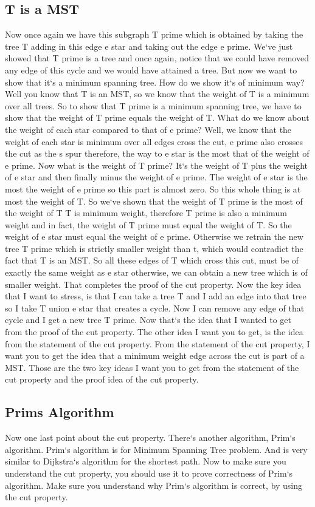 \subsection{T is a MST}
Now once again we have this subgraph T prime which is obtained by taking the tree T adding in this edge e star and taking out the edge e prime.
We`ve just showed that T prime is a tree and once again, notice that we could have removed any edge of this cycle and we would have attained a tree.
But now we want to show that it`s a minimum spanning tree.
How do we show it`s of minimum way? Well you know that T is an MST, so we know that the weight of T is a minimum over all trees.
So to show that T prime is a minimum spanning tree, we have to show that the weight of T prime equals the weight of T\@.
What do we know about the weight of each star compared to that of e prime? Well, we know that the weight of each star is minimum over all edges cross the cut, e prime also crosses the cut as the s spur therefore, the way to e star is the most that of the weight of e prime.
Now what is the weight of T prime? It`s the weight of T plus the weight of e star and then finally minus the weight of e prime.
The weight of e star is the most the weight of e prime so this part is almost zero.
So this whole thing is at most the weight of T\@.
So we`ve shown that the weight of T prime is the most of the weight of T T is minimum weight, therefore T prime is also a minimum weight and in fact, the weight of T prime must equal the weight of T\@.
So the weight of e star must equal the weight of e prime.
Otherwise we retrain the new tree T prime which is strictly smaller weight than t, which would contradict the fact that T is an MST\@.
So all these edges of T which cross this cut, must be of exactly the same weight as e star otherwise, we can obtain a new tree which is of smaller weight.
That completes the proof of the cut property.
Now the key idea that I want to stress, is that I can take a tree T and I add an edge into that tree so I take T union e star that creates a cycle.
Now I can remove any edge of that cycle and I get a new tree T prime.
Now that`s the idea that I wanted to get from the proof of the cut property.
The other idea I want you to get, is the idea from the statement of the cut property.
From the statement of the cut property, I want you to get the idea that a minimum weight edge across the cut is part of a MST\@.
Those are the two key ideas I want you to get from the statement of the cut property and the proof idea of the cut property.

\subsection{Prims Algorithm}
Now one last point about the cut property.
There`s another algorithm, Prim`s algorithm.
Prim`s algorithm is for Minimum Spanning Tree problem.
And is very similar to Dijkstra`s algorithm for the shortest path.
Now to make sure you understand the cut property, you should use it to prove correctness of Prim`s algorithm.
Make sure you understand why Prim`s algorithm is correct, by using the cut property.

